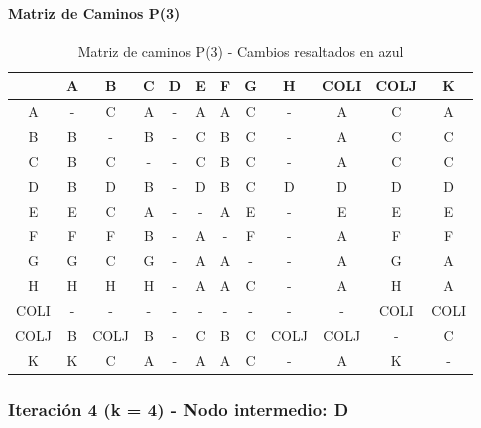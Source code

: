 \documentclass[12pt]{article}
\begin{document}
\paragraph{Matriz de Caminos P(3)}
\begin{table}[h!]
\centering
\begin{tabular}{|c|c|c|c|c|c|c|c|c|c|c|c|}
\hline
 & A & B & C & D & E & F & G & H & COLI & COLJ & K \\\hline
A & - & \cellcolor{lightblue} C & A & - & A & A & \cellcolor{lightblue} C & - & A & \cellcolor{lightblue} C & A \\\hline
B & B & - & B & - & \cellcolor{lightblue} C & B & \cellcolor{lightblue} C & - & A & \cellcolor{lightblue} C & \cellcolor{lightblue} C \\\hline
C & B & C & - & - & C & B & C & - & A & C & C \\\hline
D & B & D & B & - & D & B & \cellcolor{lightblue} C & D & D & D & D \\\hline
E & E & \cellcolor{lightblue} C & A & - & - & A & E & - & E & E & E \\\hline
F & F & F & B & - & A & - & F & - & A & F & F \\\hline
G & G & \cellcolor{lightblue} C & G & - & A & A & - & - & A & G & A \\\hline
H & H & H & H & - & A & A & \cellcolor{lightblue} C & - & A & H & A \\\hline
COLI & - & - & - & - & - & - & - & - & - & COLI & COLI \\\hline
COLJ & B & COLJ & B & - & \cellcolor{lightblue} C & B & \cellcolor{lightblue} C & COLJ & COLJ & - & \cellcolor{lightblue} C \\\hline
K & K & \cellcolor{lightblue} C & A & - & A & A & \cellcolor{lightblue} C & - & A & K & - \\\hline
\end{tabular}
\caption{Matriz de caminos P(3) - Cambios resaltados en azul}
\end{table}

\subsubsection{Iteración 4 (k = 4) - Nodo intermedio: D}
\end{document}
